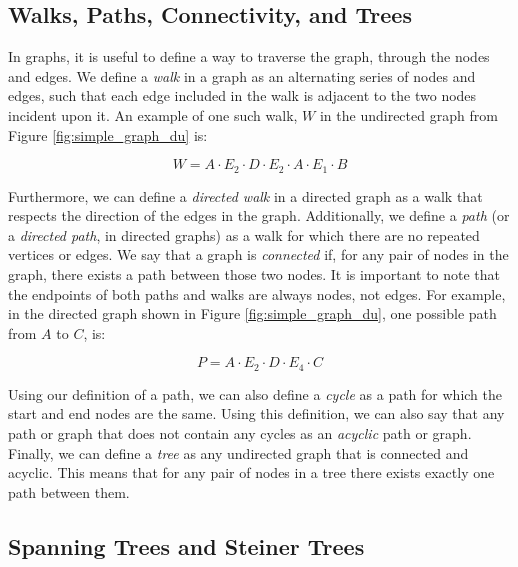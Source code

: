 \documentclass[12pt,twoside]{reedthesis}
\theoremstyle{definition}
\begin{document}
   \subsection{Walks, Paths, Connectivity, and Trees}

   In graphs, it is useful to define a way to traverse the graph, through the nodes and edges. We define a \textit{walk} in a graph as an alternating series of nodes and edges, such that each edge included in the walk is adjacent to the two nodes incident upon it. An example of one such walk, $W$ in the undirected graph from Figure \ref{fig:simple_graph_du} is:\par

   \begin{equation*}
     W = A \cdot E_2 \cdot D \cdot E_2 \cdot A \cdot E_1 \cdot B
   \end{equation*}

   Furthermore, we can define a \textit{directed walk} in a directed graph as a walk that respects the direction of the edges in the graph. Additionally, we define a \textit{path} (or a \textit{directed path}, in directed graphs) as a walk for which there are no repeated vertices or edges. We say that a graph is \textit{connected} if, for any pair of nodes in the graph, there exists a path between those two nodes. It is important to note that the endpoints of both paths and walks are always nodes, not edges. For example, in the directed graph shown in Figure \ref{fig:simple_graph_du}, one possible path from $A$ to $C$, is:\par

   \begin{equation*}
     P = A \cdot E_2 \cdot D \cdot E_4 \cdot C
   \end{equation*}

   Using our definition of a path, we can also define a \textit{cycle} as a path for which the start and end nodes are the same. Using this definition, we can also say that any path or graph that does not contain any cycles as an \textit{acyclic} path or graph. Finally, we can define a \textit{tree} as any undirected graph that is connected and acyclic. This means that for any pair of nodes in a tree there exists exactly one path between them.\par

   \subsection{Spanning Trees and Steiner Trees}
\end{document}
